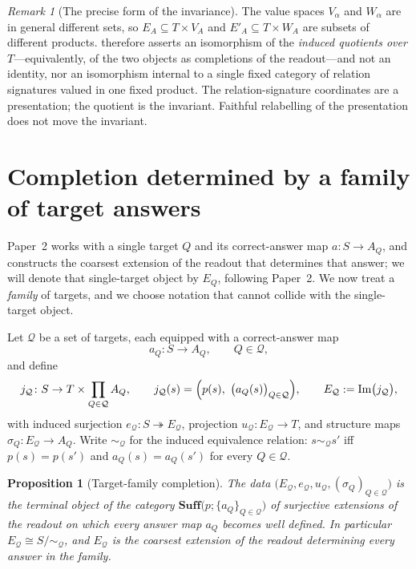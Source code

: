 \documentclass[11pt,reqno]{amsart}
\theoremstyle{plain}
\newtheorem{proposition}[theorem]{Proposition}
\theoremstyle{definition}
\theoremstyle{remark}
\newtheorem{remark}[theorem]{Remark}
\numberwithin{equation}{section}
\DeclareMathOperator{\Image}{Im}
\begin{document}
\begin{remark}[The precise form of the invariance]
\label{rem:reparam-precise}
The value spaces $V_\alpha$ and $W_\alpha$ are in general different sets, so $E_A\subseteq T\times
V_A$ and $E'_A\subseteq T\times W_A$ are subsets of different products.  therefore
asserts an isomorphism of the \emph{induced quotients over $T$}---equivalently, of the two objects as
completions of the readout---and not an identity, nor an isomorphism internal to a single fixed
category of relation signatures valued in one fixed product. The relation-signature coordinates are a
presentation; the quotient is the invariant. Faithful relabelling of the presentation does not move
the invariant.
\end{remark}

\section{Completion determined by a family of target answers}
\label{sec:targets}

Paper~2 \cite{Paper2} works with a single target $Q$ and its correct-answer map $a\colon S\to A_Q$,
and constructs the coarsest extension of the readout that determines that answer; we will denote that
single-target object by $E_Q$, following Paper~2. We now treat a \emph{family} of targets, and we
choose notation that cannot collide with the single-target object.

Let $\mathcal Q$ be a set of targets, each equipped with a correct-answer map
\begin{equation}
\label{eq:answers}
a_Q\colon S\longrightarrow A_Q,\qquad Q\in\mathcal Q ,
\end{equation}
and define
\begin{equation}
\label{eq:EQfam}
j_{\mathcal Q}\colon S\to T\times\prod_{Q\in\mathcal Q}A_Q,
\qquad
j_{\mathcal Q}(s)=\Bigl(p(s),\ \bigl(a_Q(s)\bigr)_{Q\in\mathcal Q}\Bigr),
\qquad
E_{\mathcal Q}:=\Image\bigl(j_{\mathcal Q}\bigr),
\end{equation}
with induced surjection $e_{\mathcal Q}\colon S\twoheadrightarrow E_{\mathcal Q}$, projection
$u_{\mathcal Q}\colon E_{\mathcal Q}\to T$, and structure maps $\sigma_Q\colon E_{\mathcal Q}\to A_Q$.
Write $\sim_{\mathcal Q}$ for the induced equivalence relation: $s\sim_{\mathcal Q}s'$ iff $p(s)=p(s')$
and $a_Q(s)=a_Q(s')$ for every $Q\in\mathcal Q$.

\begin{proposition}[Target-family completion]
\label{prop:target-completion}
The data $\bigl(E_{\mathcal Q},e_{\mathcal Q},u_{\mathcal Q},(\sigma_Q)_{Q\in\mathcal Q}\bigr)$ is the
terminal object of the category $\mathbf{Suff}\bigl(p;\{a_Q\}_{Q\in\mathcal Q}\bigr)$ of surjective
extensions of the readout on which every answer map $a_Q$ becomes well defined. In particular
$E_{\mathcal Q}\cong S/\!\sim_{\mathcal Q}$, and $E_{\mathcal Q}$ is the coarsest extension of the
readout determining every answer in the family.
\end{proposition}
\end{document}
